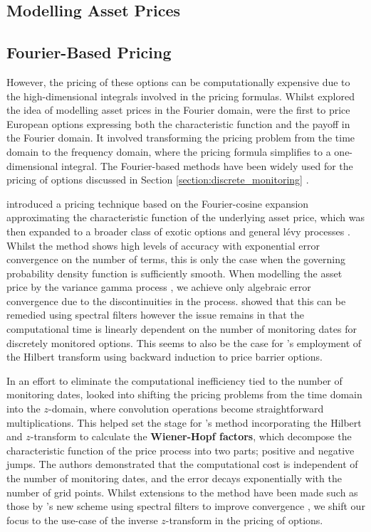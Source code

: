 \documentclass[a4paper]{report}
\begin{document}
\subsection{Modelling Asset Prices}

\subsection{Fourier-Based Pricing}
However, the pricing of these options can be computationally expensive due to the high-dimensional integrals involved in the pricing formulas. Whilst \citet{heston1993closed} explored the idea of modelling asset prices in the Fourier domain, \citet{carr1999option} were the first to price European options expressing both the characteristic function and the payoff in the Fourier domain. It involved transforming the pricing problem from the time domain to the frequency domain, where the pricing formula simplifies to a one-dimensional integral. The Fourier-based methods have been widely used for the pricing of options discussed in Section \ref{section:discrete_monitoring} \citep{eberlein2010analysis}.

\citet{fang2009novel} introduced a pricing technique based on the Fourier-cosine expansion approximating the characteristic function of the underlying asset price, which was then expanded to a broader class of exotic options \citep{fang2009pricing, fang2011fourier} and general l\'evy processes \citep{lord2008fast}. Whilst the method shows high levels of accuracy with exponential error convergence on the number of terms, this is only the case when the governing probability density function is sufficiently smooth. When modelling the asset price by the variance gamma process \citep{madan1998variance}, we achieve only algebraic error convergence due to the discontinuities in the process. \citet{ruijter2015application} showed that this can be remedied using spectral filters however the issue remains in that the computational time is linearly dependent on the number of monitoring dates for discretely monitored options. This seems to also be the case for \citet{feng2008pricing}'s employment of the Hilbert transform using backward induction to price barrier options. 

In an effort to eliminate the computational inefficiency tied to the number of monitoring dates, \citet{fusai2006exact} looked into shifting the pricing problems from the time domain into the $z$-domain, where convolution operations become straightforward multiplications. This helped set the stage for \citet{fusai2016spitzer}'s method incorporating the Hilbert and $z$-transform to calculate the \textbf{Wiener-Hopf factors}, which decompose the characteristic function of the price process into two parts; positive and negative jumps. The authors demonstrated that the computational cost is independent of the number of monitoring dates, and the error decays exponentially with the number of grid points. Whilst extensions to the method have been made such as those by \citet{phelan2018fourier}'s new scheme using spectral filters to improve convergence \citep{phelan2019hilbert}, we shift our focus to the use-case of the inverse $z$-transform in the pricing of options.
\end{document}
